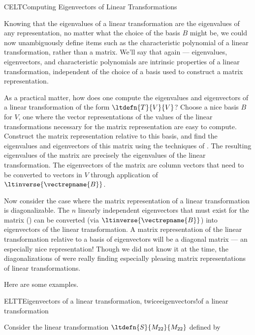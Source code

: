 \begin{subsect}{CELT}{Computing Eigenvectors of Linear Transformations}
%
\begin{para}Knowing that the eigenvalues of a linear transformation are the eigenvalues of any representation, no matter what the choice of the basis $B$ might be, we could now unambiguously define items such as the characteristic polynomial of a linear transformation, rather than a matrix.  We'll say that again --- eigenvalues, eigenvectors, and characteristic polynomials are intrinsic properties of a linear transformation, independent of the choice of a basis used to construct a matrix representation.\end{para}
%
\begin{para}As a practical matter, how does one compute the eigenvalues and eigenvectors of a linear transformation of the form $\ltdefn{T}{V}{V}$?  Choose a nice basis $B$ for $V$, one where the vector representations of the values of the linear transformations necessary for the matrix representation are easy to compute.  Construct the matrix representation relative to this basis, and find the eigenvalues and eigenvectors of this matrix using the techniques of .  The resulting eigenvalues of the matrix are precisely the eigenvalues of the linear transformation.  The eigenvectors of the matrix are column vectors that need to be converted to vectors in $V$ through application of $\ltinverse{\vectrepname{B}}$.\end{para}
%
\begin{para}Now consider the case where the matrix representation of a linear transformation is diagonalizable.  The $n$ linearly independent eigenvectors that must exist for the matrix () can be converted (via $\ltinverse{\vectrepname{B}}$) into eigenvectors of the linear transformation.  A matrix representation of the linear transformation relative to a basis of eigenvectors will be a diagonal matrix --- an especially nice representation!  Though we did not know it at the time, the diagonalizations of  were really finding especially pleasing matrix representations of linear transformations.\end{para}
%
\begin{para}Here are some examples.\end{para}
%
%
\begin{example}{ELTT}{Eigenvectors of a linear transformation, twice}{eigenvectors!of a linear transformation}
%
\begin{para}Consider the linear transformation $\ltdefn{S}{M_{22}}{M_{22}}$ defined by

\end{para}
\end{example}
\end{subsect}
